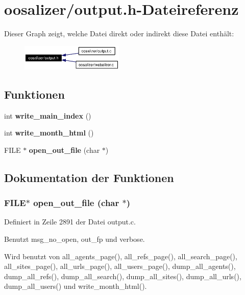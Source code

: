 \section{oosalizer/output.h-Dateireferenz}
\label{output_8h}


Dieser Graph zeigt, welche Datei direkt oder indirekt diese Datei enth\"{a}lt:\begin{figure}[H]
\begin{center}
\leavevmode
\includegraphics[width=139pt]{output_8h__dep__incl}
\end{center}
\end{figure}
\subsection*{Funktionen}
\begin{CompactItemize}
\item 
int {\bf write\_\-main\_\-index} ()
\item 
int {\bf write\_\-month\_\-html} ()
\item 
FILE $\ast$ {\bf open\_\-out\_\-file} (char $\ast$)
\end{CompactItemize}


\subsection{Dokumentation der Funktionen}
\subsubsection{\setlength{\rightskip}{0pt plus 5cm}FILE$\ast$ open\_\-out\_\-file (char $\ast$)}\label{output_8h_e3a7ea5eb1ee0a6be7ae6e674102897c}




Definiert in Zeile 2891 der Datei output.c.

Benutzt msg\_\-no\_\-open, out\_\-fp und verbose.

Wird benutzt von all\_\-agents\_\-page(), all\_\-refs\_\-page(), all\_\-search\_\-page(), all\_\-sites\_\-page(), all\_\-urls\_\-page(), all\_\-users\_\-page(), dump\_\-all\_\-agents(), dump\_\-all\_\-refs(), dump\_\-all\_\-search(), dump\_\-all\_\-sites(), dump\_\-all\_\-urls(), dump\_\-all\_\-users() und write\_\-month\_\-html().

